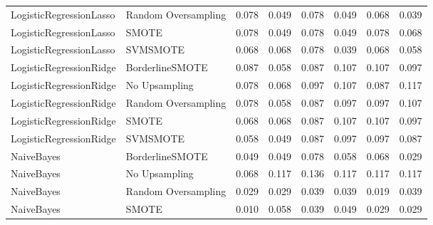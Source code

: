 \begin{tabular}{llllllll}
     LogisticRegressionLasso & Random Oversampling & 0.078 &                     0.049 &                 0.078 &                  0.049 &                                   0.068 &    0.039 \\
     LogisticRegressionLasso &               SMOTE & 0.078 &                     0.049 &                 0.078 &                  0.049 &                                   0.078 &    0.068 \\
     LogisticRegressionLasso &            SVMSMOTE & 0.068 &                     0.068 &                 0.078 &                  0.039 &                                   0.068 &    0.058 \\
     LogisticRegressionRidge &     BorderlineSMOTE & 0.087 &                     0.058 &                 0.087 &                  0.107 &                                   0.107 &    0.097 \\
     LogisticRegressionRidge &       No Upsampling & 0.078 &                     0.068 &                 0.097 &                  0.107 &                                   0.087 &    0.117 \\
     LogisticRegressionRidge & Random Oversampling & 0.078 &                     0.058 &                 0.087 &                  0.097 &                                   0.097 &    0.107 \\
     LogisticRegressionRidge &               SMOTE & 0.068 &                     0.068 &                 0.087 &                  0.107 &                                   0.107 &    0.097 \\
     LogisticRegressionRidge &            SVMSMOTE & 0.058 &                     0.049 &                 0.087 &                  0.097 &                                   0.097 &    0.087 \\
                  NaiveBayes &     BorderlineSMOTE & 0.049 &                     0.049 &                 0.078 &                  0.058 &                                   0.068 &    0.029 \\
                  NaiveBayes &       No Upsampling & 0.068 &                     0.117 &                 0.136 &                  0.117 &                                   0.117 &    0.117 \\
                  NaiveBayes & Random Oversampling & 0.029 &                     0.029 &                 0.039 &                  0.039 &                                   0.019 &    0.039 \\
                  NaiveBayes &               SMOTE & 0.010 &                     0.058 &                 0.039 &                  0.049 &                                   0.029 &    0.029 \\

\end{tabular}
